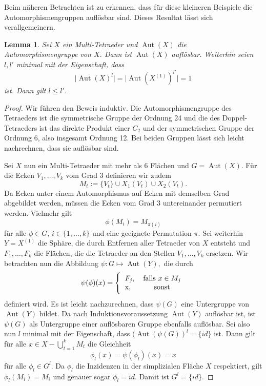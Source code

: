 \documentclass[12pt,titlepage,twoside,cleardoublepage]{article}
\theoremstyle{nummermitklammern}
\newtheorem{lemma}[temp]{Lemma}
\newtheorem{lemma}[zahl]{Lemma}
\numberwithin{equation}{section}
\DeclareMathOperator{\Aut}{Aut}
\begin{document}
Beim näheren Betrachten ist zu erkennen, dass für diese kleineren Beispiele die Automorphismengruppen auflösbar sind. Dieses Resultat lässt sich verallgemeinern. 
\begin{lemma}
Sei $X$ ein Multi-Tetraeder und $\Aut(X)$ die Automorphismengruppe von $X$. Dann ist $\Aut(X)$ auflösbar.
Weiterhin seien $l,l'$ minimal mit der Eigenschaft, dass
\[
\vert \Aut(X)^l\vert=\vert \Aut(X^{(1)})^{l'}\vert =1
\] ist. Dann gilt $l\leq l'$.
\end{lemma}
\begin{proof}
Wir führen den Beweis induktiv. Die Automorphismengruppe des Tetraeders ist die symmetrische Gruppe der Ordnung 24 und die des Doppel-Tetraeders ist das direkte Produkt einer $C_2$ und der symmetrischen Gruppe der Ordnung 6, also insgesamt Ordnung 12. Bei beiden Gruppen lässt sich leicht nachrechnen, dass sie auflösbar sind.

Sei $X$ nun ein Multi-Tetraeder mit mehr als  6 Flächen und $G=\Aut(X)$. Für die Ecken $V_1,\ldots,V_k$ vom Grad $3$ definieren wir zudem 
\[
M_t:=\{V_t\} \cup X_1(V_t) \cup X_2(V_t).  
\] 
Da Ecken unter einem Automorphismus auf Ecken mit demselben Grad abgebildet werden, müssen die Ecken vom Grad 3 untereinander permutiert werden. Vielmehr gilt 
\[
\phi(M_i)=M_{\pi(i)} 
\]
für alle $\phi \in G,\,i\in \{1,\ldots,k\}$ und eine geeignete Permutation $\pi.$ Sei weiterhin $Y=X^{(1)}$ die Sphäre, die durch Entfernen aller Tetraeder von $X$ entsteht und $F_1,\ldots,F_k$ die Flächen, die die Tetraeder an den Stellen $V_1,\ldots,V_k$ ersetzen. Wir betrachten nun die Abbildung $\psi:G\mapsto \Aut(Y),$ die durch  
\[
\psi(\phi)(x)=\Biggl\{
\begin{tabular}[l]{lcr}
$F_j$,&\textcolor{black}{ falls  $x\in M_j$} \\
x,& sonst\\
\end{tabular}
\]
definiert wird. Es ist leicht nachzurechnen, dass $\psi(G)$ eine Untergruppe von $\Aut(Y)$ bildet. Da nach Induktionsvoraussetzung $\Aut(Y)$ auflösbar ist, ist $\psi(G)$ als Untergruppe einer auflösbaren Gruppe ebenfalls auflösbar. 
Sei also nun $l$ minimal mit der Eigenschaft, dass $(\Aut(\psi(G))^l=\{id\}$ ist. Dann gilt für alle $x\in X-\bigcup_{t=1}^k M_t$ die Gleichheit 
\[
\phi_l(x)=\psi(\phi_l)(x)=x
\] für alle $\phi_l \in G^l$. Da $\phi_l$ die Inzidenzen in der simplizialen Fläche $X$ respektiert, gilt $\phi_l(M_i)=M_i$ und genauer sogar $\phi_l=id.$ Damit ist $G^l =\{id\}$.
  
\end{proof}
\end{document}
